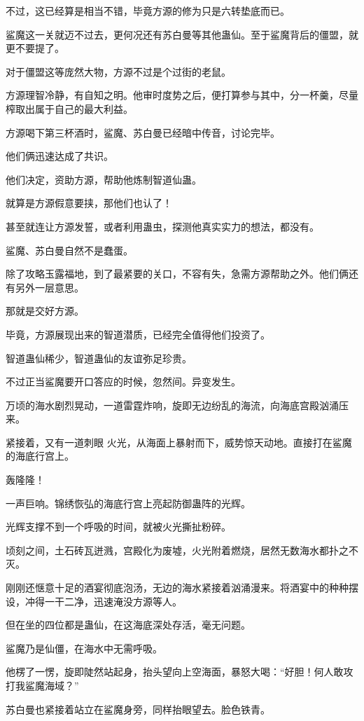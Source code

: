 \begin{this_body}
不过，这已经算是相当不错，毕竟方源的修为只是六转垫底而已。

鲨魔这一关就迈不过去，更何况还有苏白曼等其他蛊仙。至于鲨魔背后的僵盟，就更不要提了。

对于僵盟这等庞然大物，方源不过是个过街的老鼠。

方源理智冷静，有自知之明。他审时度势之后，便打算参与其中，分一杯羹，尽量榨取出属于自己的最大利益。

方源喝下第三杯酒时，鲨魔、苏白曼已经暗中传音，讨论完毕。

他们俩迅速达成了共识。

他们决定，资助方源，帮助他炼制智道仙蛊。

就算是方源假意要挟，那他们也认了！

甚至就连让方源发誓，或者利用蛊虫，探测他真实实力的想法，都没有。

鲨魔、苏白曼自然不是蠢蛋。

除了攻略玉露福地，到了最紧要的关口，不容有失，急需方源帮助之外。他们俩还有另外一层意思。

那就是交好方源。

毕竟，方源展现出来的智道潜质，已经完全值得他们投资了。

智道蛊仙稀少，智道蛊仙的友谊弥足珍贵。

不过正当鲨魔要开口答应的时候，忽然间。异变发生。

万顷的海水剧烈晃动，一道雷霆炸响，旋即无边纷乱的海流，向海底宫殿汹涌压来。

紧接着，又有一道刺眼 火光，从海面上暴射而下，威势惊天动地。直接打在鲨魔的海底行宫上。

轰隆隆！

一声巨响。锦绣恢弘的海底行宫上亮起防御蛊阵的光辉。

光辉支撑不到一个呼吸的时间，就被火光撕扯粉碎。

顷刻之间，土石砖瓦迸溅，宫殿化为废墟，火光附着燃烧，居然无数海水都扑之不灭。

刚刚还惬意十足的酒宴彻底泡汤，无边的海水紧接着汹涌漫来。将酒宴中的种种摆设，冲得一干二净，迅速淹没方源等人。

但在坐的四位都是蛊仙，在这海底深处存活，毫无问题。

鲨魔乃是仙僵，在海水中无需呼吸。

他楞了一愣，旋即陡然站起身，抬头望向上空海面，暴怒大喝：“好胆！何人敢攻打我鲨魔海域？”

苏白曼也紧接着站立在鲨魔身旁，同样抬眼望去。脸色铁青。


\end{this_body}
